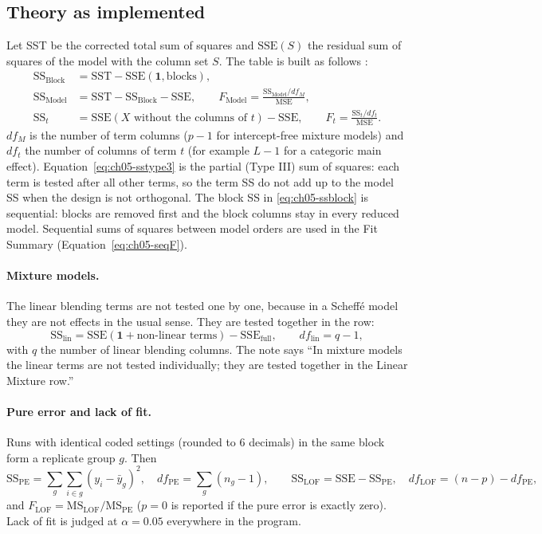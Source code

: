 \subsection*{Theory as implemented}
Let SST be the corrected total sum of squares and $\text{SSE}(S)$ the residual sum of squares of the model
with the column set $S$. The table is built as follows \citep{montgomery2017,myers2016}:
\begin{align}
  \text{SS}_{\text{Block}}&=\text{SST}-\text{SSE}(\mathbf 1,\text{blocks}), \label{eq:ch05-ssblock}\\
  \text{SS}_{\text{Model}}&=\text{SST}-\text{SS}_{\text{Block}}-\text{SSE}, \qquad
  F_{\text{Model}}=\frac{\text{SS}_{\text{Model}}/df_M}{\text{MSE}}, \label{eq:ch05-ssmodel}\\
  \text{SS}_t&=\text{SSE}(X\text{ without the columns of }t)-\text{SSE}, \qquad
  F_t=\frac{\text{SS}_t/df_t}{\text{MSE}}. \label{eq:ch05-sstype3}
\end{align}
$df_M$ is the number of term columns ($p-1$ for intercept-free mixture models) and $df_t$ the number of
columns of term $t$ (for example $L-1$ for a categoric main effect). Equation~\eqref{eq:ch05-sstype3} is
the partial (Type III) sum of squares: each term is tested after all other terms, so the term SS do not
add up to the model SS when the design is not orthogonal. The block SS in
\eqref{eq:ch05-ssblock} is sequential: blocks are removed first and the block columns stay in every reduced
model. Sequential sums of squares between model orders are used in the Fit Summary
(Equation~\ref{eq:ch05-seqF}).

\paragraph{Mixture models.} The linear blending terms are not tested one by one, because in a Scheffé model
they are not effects in the usual sense. They are tested together in the  row:
\begin{equation}
  \text{SS}_{\text{lin}}=\text{SSE}(\mathbf 1+\text{non-linear terms})-\text{SSE}_{\text{full}},\qquad
  df_{\text{lin}}=q-1,
  \label{eq:ch05-linmix}
\end{equation}
with $q$ the number of linear blending columns. The note says ``In mixture models the linear terms are not
tested individually; they are tested together in the Linear Mixture row.''

\paragraph{Pure error and lack of fit.} Runs with identical coded settings (rounded to 6 decimals) in the
same block form a replicate group $g$. Then
\begin{equation}
  \text{SS}_{\text{PE}}=\sum_g\sum_{i\in g}(y_i-\bar y_g)^2,\quad df_{\text{PE}}=\sum_g(n_g-1),\qquad
  \text{SS}_{\text{LOF}}=\text{SSE}-\text{SS}_{\text{PE}},\quad df_{\text{LOF}}=(n-p)-df_{\text{PE}},
  \label{eq:ch05-lof}
\end{equation}
and $F_{\text{LOF}}=\text{MS}_{\text{LOF}}/\text{MS}_{\text{PE}}$ ($p=0$ is reported if the pure error is
exactly zero). Lack of fit is judged at $\alpha=0.05$ everywhere in the program.

